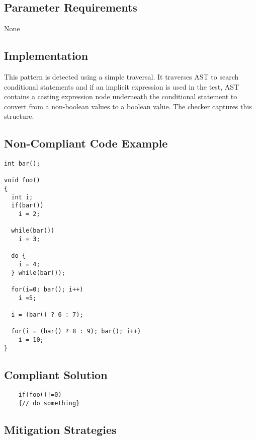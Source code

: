 \subsection{Parameter Requirements}

None   

\subsection{Implementation}

This pattern is detected using a simple traversal. It traverses AST to search conditional statements and if an implicit expression is used in the test, AST contains a casting expression node underneath the conditional statement to convert from a non-boolean values to a boolean value. The checker captures this structure.


\subsection{Non-Compliant Code Example}


\begin{verbatim}
int bar();

void foo()
{
  int i;
  if(bar())
    i = 2;

  while(bar())
    i = 3;

  do {
    i = 4;
  } while(bar());

  for(i=0; bar(); i++)
    i =5;

  i = (bar() ? 6 : 7);

  for(i = (bar() ? 8 : 9); bar(); i++)
    i = 10;
}
\end{verbatim}

\subsection{Compliant Solution}


\begin{verbatim}
	if(foo()!=0)
	{// do something}
\end{verbatim}

\subsection{Mitigation Strategies}
